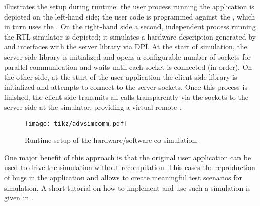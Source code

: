 \medskip
{} illustrates the setup during runtime:
the user process running the application is depicted on the left-hand side; the user code is programmed against the , which in turn uses the . 
On the right-hand side a second, independent process running the RTL simulator is depicted; it simulates a hardware description generated by \tpc{} and interfaces with the server library via DPI.
At the start of simulation, the server-side library is initialized and opens a configurable number of sockets for parallel communication and waits until each socket is connected (in order).
On the other side, at the start of the user application the client-side library is initialized and attempts to connect to the server sockets.
Once this process is finished, the client-side transmits all  calls transparently via the sockets to the server-side at the simulator, providing a virtual remote .
%
\begin{figure}
  \centering%
  \texttt{[image: tikz/advsimcomm.pdf]}
  \caption{Runtime setup of the hardware/software co-simulation.}
  \label{fig:dpi-sim}
\end{figure}

\medskip
One major benefit of this approach is that the original user application can be used to drive the simulation without recompilation.
This eases the reproduction of bugs in the application and allows to create meaningful test scenarios for simulation.
A short tutorial on how to implement and use such a simulation is given in .

